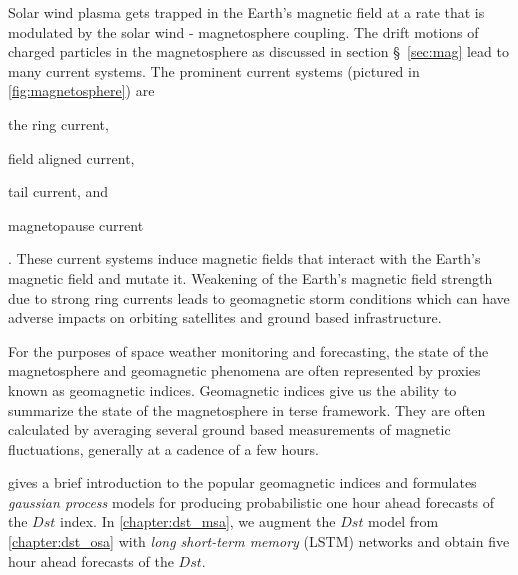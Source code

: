 Solar wind plasma gets trapped in the Earth's magnetic field at a rate that is modulated by the 
solar wind - magnetosphere coupling. The drift motions of charged particles in the magnetosphere as 
discussed in section \S~\ref{sec:mag} lead to many current systems. The prominent current systems 
(pictured in \cref{fig:magnetosphere}) are 
%
\begin{enumerate*} 
    \item the ring current,  
    \item field aligned current, 
    \item tail current, and
    \item magnetopause current 
\end{enumerate*}.  
%
These current systems induce magnetic fields that interact with the Earth's magnetic field and 
mutate it. Weakening of the Earth's magnetic field strength due to strong ring currents leads to 
geomagnetic storm conditions which can have adverse impacts on orbiting satellites and ground based 
infrastructure.

For the purposes of space weather monitoring and forecasting, the state of the magnetosphere and 
geomagnetic phenomena are often represented by proxies known as geomagnetic indices. Geomagnetic 
indices give us the ability to summarize the state of the magnetosphere in terse framework. They 
are often calculated by averaging several ground based measurements of magnetic fluctuations, 
generally at a cadence of a few hours.

 gives a brief introduction to the popular geomagnetic indices and formulates 
\emph{gaussian process} models for producing probabilistic one hour ahead forecasts of the $Dst$ 
index. In \cref{chapter:dst_msa}, we augment the $Dst$ model from \cref{chapter:dst_osa} with 
\emph{long short-term memory} (LSTM) networks and obtain five hour ahead forecasts of the $Dst$.

\clearpage

%
%
